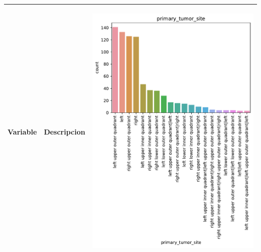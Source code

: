 \begin{table}[!htb]
\begin{threeparttable}
\begin{tabular}{p{2.5cm} p{7cm} p{6.5cm}}
			Variable
			& Descripcion
			
			& \begin{center}\includegraphics[width=1\linewidth]{NOTEBOOK/IMAGENES_DESCRIPTIVAS/42_primary_tumor_site}\end{center}
			\\ \hline
			

\end{tabular}
\end{threeparttable}
\end{table}
